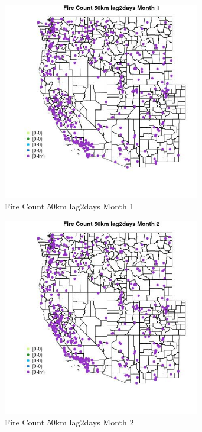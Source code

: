 \begin{figure} 
\centering  
\includegraphics[width=0.77\textwidth]{Code_Outputs/Report_ML_input_PM25_Step4_part_e_de_duplicated_aves_compiled_2019-05-18wNAs_MapObsMo1Fire_Count_50km_lag2days.jpg} 
\caption{\label{fig:Report_ML_input_PM25_Step4_part_e_de_duplicated_aves_compiled_2019-05-18wNAsMapObsMo1Fire_Count_50km_lag2days}Fire Count 50km lag2days Month 1} 
\end{figure} 
 

\begin{figure} 
\centering  
\includegraphics[width=0.77\textwidth]{Code_Outputs/Report_ML_input_PM25_Step4_part_e_de_duplicated_aves_compiled_2019-05-18wNAs_MapObsMo2Fire_Count_50km_lag2days.jpg} 
\caption{\label{fig:Report_ML_input_PM25_Step4_part_e_de_duplicated_aves_compiled_2019-05-18wNAsMapObsMo2Fire_Count_50km_lag2days}Fire Count 50km lag2days Month 2} 
\end{figure} 
 

